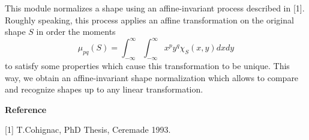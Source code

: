 This module normalizes a shape using an affine-invariant process described
in [1]. Roughly speaking, this process applies an affine transformation on the
original shape $S$ in order the moments 
$$\mu_{pq}(S)=\int_{-\infty}^{\infty}\int_{-\infty}^{\infty}x^py^q \chi_S(x,y)dxdy$$
to satisfy some properties which cause this transformation to be unique. 
This way, we obtain an affine-invariant 
shape normalization which allows to compare and recognize shapes up to 
any linear transformation.

\vskip 0.6cm

{\bf Reference}

[1] T.Cohignac, PhD Thesis, Ceremade 1993.